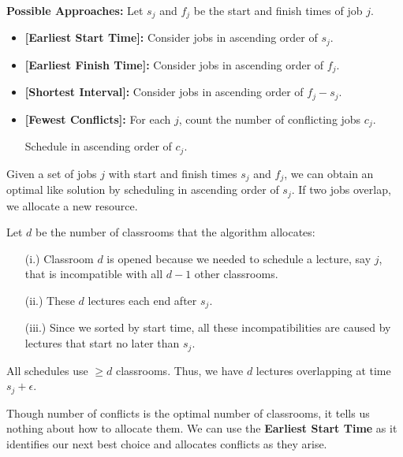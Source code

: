 \newpage
\textbf{Possible Approaches:} Let $s_j$ and $f_j$ be the start and finish times of job $j$.
\begin{itemize}
    \item \textbf{[Earliest Start Time]:} Consider jobs in ascending order of $s_j$.
    \item \textbf{[Earliest Finish Time]:} Consider jobs in ascending order of $f_j$.
    \item \textbf{[Shortest Interval]:} Consider jobs in ascending order of $f_j - s_j$.
    \item \textbf{[Fewest Conflicts]:} For each $j$, count the number of conflicting jobs $c_j$. \par
    \hspace{9.3em} Schedule in ascending order of $c_j$.
\end{itemize}
\begin{theo}

    \label{theo:est}

    Given a set of jobs $j$ with start and finish times $s_j$ and $f_j$, we can obtain an optimal like solution by scheduling in ascending order of $s_j$.
    If two jobs overlap, we allocate a new resource.
\end{theo}

\begin{Proof}
    Let $d$ be the number of classrooms that the algorithm allocates:

    \begin{enumerate}
        \item [(i.)] Classroom $d$ is opened because we needed to schedule a lecture, say $j$, that is incompatible with all $d - 1$ other classrooms.
        \item [(ii.)] These $d$ lectures each end after $s_j$.
        \item [(iii.)] Since we sorted by start time, all these incompatibilities are caused by lectures that start no later than $s_j$.
    \end{enumerate}
    \noindent
    All schedules use $\geq d$ classrooms. Thus, we have $d$ lectures overlapping at time $s_j + \epsilon$.

    \end{Proof}

    \begin{Tip}
        Though number of conflicts is the optimal number of classrooms, it tells us nothing about how to allocate them. We can use the \textbf{Earliest Start Time} as 
        it identifies our next best choice and allocates conflicts as they arise.
    \end{Tip}


